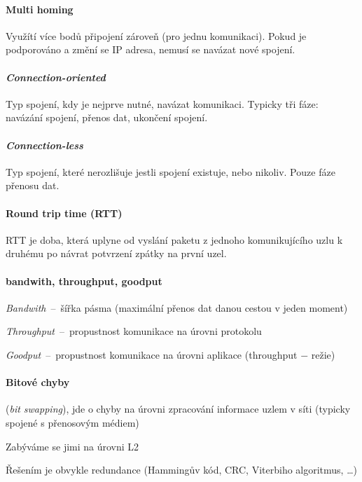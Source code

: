 \paragraph*{Multi homing} Využítí více bodů připojení zároveň (pro jednu komunikaci). Pokud je podporováno a změní se IP adresa, nemusí se navázat nové spojení.

\paragraph*{\textit{Connection-oriented}} Typ spojení, kdy je nejprve nutné, navázat komunikaci. Typicky tři fáze: navázání spojení, přenos dat, ukončení spojení.

\paragraph*{\textit{Connection-less}} Typ spojení, které nerozlišuje jestli spojení existuje, nebo nikoliv. Pouze fáze přenosu dat.

\paragraph*{Round trip time (RTT)} RTT je doba, která uplyne od vyslání paketu z jednoho komunikujícího uzlu k druhému po návrat potvrzení zpátky na první uzel.

\paragraph*{bandwith, throughput, goodput} \begin{compactitem}
    \item \textit{Bandwith}~--~šířka pásma (maximální přenos dat danou cestou v jeden moment)
    \item \textit{Throughput}~--~propustnost komunikace na úrovni protokolu
    \item \textit{Goodput}~--~propustnost komunikace na úrovni aplikace (throughput $-$ režie)
\end{compactitem}

\paragraph*{Bitové chyby} \begin{compactitem}
    \item {} (\textit{bit swapping}), jde o chyby na úrovni zpracování informace uzlem v síti (typicky spojené s přenosovým médiem)
    \item Zabýváme se jimi na úrovni L2
    \item Řešením je obvykle redundance (Hammingův kód, CRC, Viterbiho algoritmus, \dots)
\end{compactitem}

